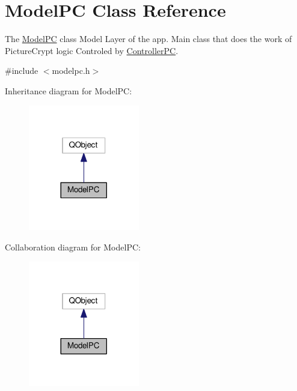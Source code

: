 \hypertarget{class_model_p_c}{}\section{Model\+PC Class Reference}
\label{class_model_p_c}


The \hyperlink{class_model_p_c}{Model\+PC} class Model Layer of the app. Main class that does the work of Picture\+Crypt logic Controled by \hyperlink{class_controller_p_c}{Controller\+PC}.  




{\ttfamily \#include $<$modelpc.\+h$>$}



Inheritance diagram for Model\+PC\+:
\nopagebreak
\begin{figure}[H]
\begin{center}
\leavevmode
\includegraphics[width=137pt]{class_model_p_c__inherit__graph}
\end{center}
\end{figure}


Collaboration diagram for Model\+PC\+:
\nopagebreak
\begin{figure}[H]
\begin{center}
\leavevmode
\includegraphics[width=137pt]{class_model_p_c__coll__graph}
\end{center}
\end{figure}
